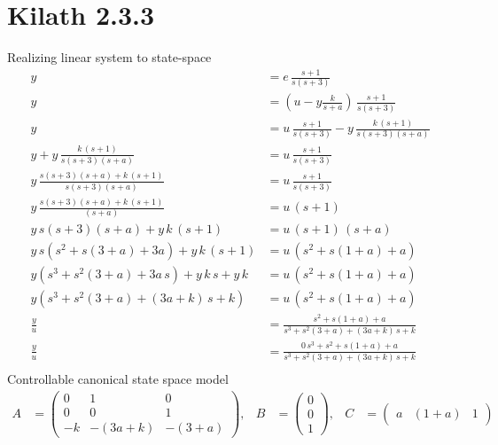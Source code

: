 \section{Kilath 2.3.3}
Realizing linear system to state-space
\begin{align*}
    y &= e\,\frac{s+1}{s\left(s+3\right)} \\ y &= \left(u - y\frac{k}{s+a}\right)\,\frac{s+1}{s\left(s+3\right)} \\ 
    y &= u\,\frac{s+1}{s\left(s+3\right)} - y\,\frac{k\,\left(s+1\right)}{s\left(s+3\right)\left(s+a\right)}\\
    y + y\,\frac{k\,\left(s+1\right)}{s\left(s+3\right)\left(s+a\right)} &= u\,\frac{s+1}{s\left(s+3\right)} \\
    y\,\frac{s\left(s+3\right)\left(s+a\right) + k\,\left(s+1\right)}{s\left(s+3\right)\left(s+a\right)} &= u\,\frac{s+1}{s\left(s+3\right)}\\
    y\,\frac{s\left(s+3\right)\left(s+a\right) + k\,\left(s+1\right)}{\left(s+a\right)} &= u\,\left(s+1\right) \\
    y\,s\left(s+3\right)\left(s+a\right) + y\,k\,\left(s+1\right) &= u\,\left(s+1\right)\,\left(s+a\right)\\
    y\,s\left(s^2+s\left(3+a\right)+3a\right) + y\,k\,\left(s+1\right) &= u\,\left(s^2+s\left(1+a\right)+a\right) \\
    y\left(s^3+s^2\left(3+a\right)+3a\,s\right) + y\,k\,s + y\,k &= u\,\left(s^2+s\left(1+a\right)+a\right) \\
    y\left(s^3+s^2\left(3+a\right)+\left(3a + k\right)\,s + k\right) &= u\,\left(s^2+s\left(1+a\right)+a\right) \\
    \frac{y}{u} &= \frac{s^2+s\left(1+a\right)+a}{s^3+s^2\left(3+a\right)+\left(3a + k\right)\,s + k}\\
    \frac{y}{u} &= \frac{0\,s^3 + s^2+s\left(1+a\right)+a}{s^3+s^2\left(3+a\right)+\left(3a + k\right)\,s + k}\\
\end{align*}
Controllable canonical state space model
\begin{align*}
    A &= \begin{pmatrix}
        0  & 1                    & 0\\
        0  & 0                    & 1\\     
        -k & -\left(3a + k\right) & -\left(3 + a\right)
    \end{pmatrix},
    & B &= \begin{pmatrix}
        0 \\
        0 \\
        1
    \end{pmatrix},
    & C &= \begin{pmatrix}
        a & \left(1+a\right) & 1
    \end{pmatrix}
\end{align*}
